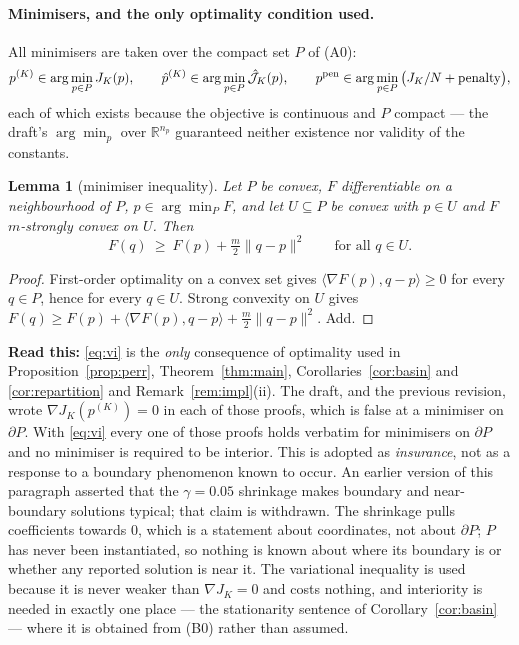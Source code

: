 \documentclass[11pt]{article}
\newtheorem{lemma}{Lemma}
\theoremstyle{remark}\newtheorem{remark}{Remark}
\newcommand{\norm}[1]{\lVert #1\rVert}
\newcommand{\hatJ}{\hat{\mathcal J}}
\newcommand{\readthis}[1]{\textbf{Read this:} #1}
\begin{document}
\paragraph{Minimisers, and the only optimality condition used.}
All minimisers are taken over the compact set $P$ of (A0):
\begin{equation}
p^{(K)}\in\arg\min_{p\in P}J_K(p),\qquad
\hat p^{(K)}\in\arg\min_{p\in P}\hatJ_K(p),\qquad
p^{\rm pen}\in\arg\min_{p\in P}\big(J_K/N+\text{penalty}\big),
\label{eq:minimisers}
\end{equation}
each of which exists because the objective is continuous and $P$ compact --- the draft's $\arg\min_p$ over $\mathbb R^{n_p}$ guaranteed neither existence nor validity of the constants.

\begin{lemma}[minimiser inequality]\label{lem:vi}
Let $P$ be convex, $F$ differentiable on a neighbourhood of $P$, $p\in\arg\min_{P}F$, and let $U\subseteq P$ be convex with $p\in U$ and $F$ $m$-strongly convex on $U$. Then
\begin{equation}
F(q)\ \ge\ F(p)+\tfrac m2\norm{q-p}^2\qquad\text{for all }q\in U.
\label{eq:vi}
\end{equation}
\end{lemma}
\begin{proof}
First-order optimality on a convex set gives $\langle\nabla F(p),q-p\rangle\ge0$ for every $q\in P$, hence for every $q\in U$. Strong convexity on $U$ gives $F(q)\ge F(p)+\langle\nabla F(p),q-p\rangle+\tfrac m2\norm{q-p}^2$. Add.
\end{proof}
\readthis{\eqref{eq:vi} is the \emph{only} consequence of optimality used in Proposition~\ref{prop:perr}, Theorem~\ref{thm:main}, Corollaries~\ref{cor:basin} and \ref{cor:repartition} and Remark~\ref{rem:impl}(ii). The draft, and the previous revision, wrote $\nabla J_K(p^{(K)})=0$ in each of those proofs, which is false at a minimiser on $\partial P$. With \eqref{eq:vi} every one of those proofs holds verbatim for minimisers on $\partial P$ and no minimiser is required to be interior. This is adopted as \emph{insurance}, not as a response to a boundary phenomenon known to occur. An earlier version of this paragraph asserted that the $\gamma=0.05$ shrinkage makes boundary and near-boundary solutions typical; that claim is withdrawn. The shrinkage pulls coefficients towards $0$, which is a statement about coordinates, not about $\partial P$; $P$ has never been instantiated, so nothing is known about where its boundary is or whether any reported solution is near it. The variational inequality is used because it is never weaker than $\nabla J_K=0$ and costs nothing, and interiority is needed in exactly one place --- the stationarity sentence of Corollary~\ref{cor:basin} --- where it is obtained from (B0) rather than assumed.}
\end{document}
